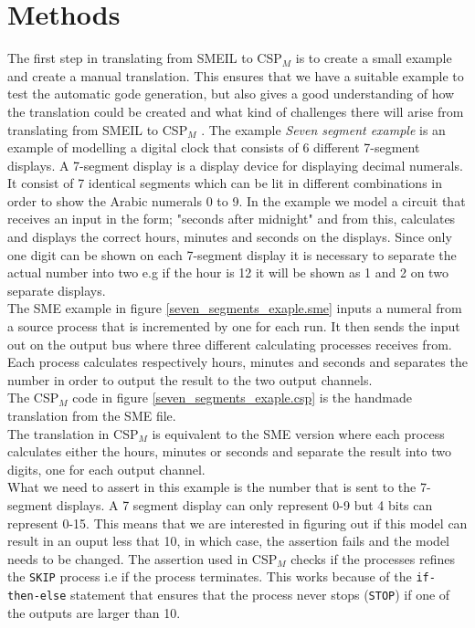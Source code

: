 \documentclass[a4paper]{report}
\newcommand{\cspm}{CSP$_M$ }
\begin{document}
\chapter{Methods}
The first step in translating from SMEIL to \cspm is to create a small example and create a manual translation. This ensures that we have a suitable example to test the automatic gode generation, but also gives a good understanding of how the translation could be created and what kind of challenges there will arise from translating from SMEIL to \cspm. 
The example \textit{Seven segment example} is an example of modelling a digital clock that consists of 6 different 7-segment displays. A 7-segment display is a display device for displaying decimal numerals. It consist of 7 identical segments which can be lit in different combinations in order to show the Arabic numerals 0 to 9. In the example we model a circuit that receives an input in the form; "seconds after midnight" and from this, calculates and displays the correct hours, minutes and seconds on the displays. Since only one digit can be shown on each 7-segment display it is necessary to separate the actual number into two e.g if the hour is 12 it will be shown as 1 and 2 on two separate displays. \\ The SME example in figure \ref{seven_segments_exaple.sme} inputs a numeral from a source process that is incremented by one for each run. It then sends the input out on the output bus where three different calculating processes receives from. Each process calculates respectively hours, minutes and seconds and separates the number in order to output the result to the two output channels. \\ The \cspm code in figure \ref{seven_segments_exaple.csp} is the handmade translation from the SME file. \\ The translation in \cspm is equivalent to the SME version where each process calculates either the hours, minutes or seconds and separate the result into two digits, one for each output channel.\\ 
What we need to assert in this example is the number that is sent to the 7-segment displays. A 7 segment display can only represent 0-9 but 4 bits can represent 0-15. This means that we are interested in figuring out if this model can result in an ouput less that 10, in which case, the assertion fails and the model needs to be changed. The assertion used in \cspm checks if the processes refines the \texttt{SKIP} process i.e if the process terminates. This works because of the \texttt{if-then-else} statement that ensures that the process never stops (\texttt{STOP}) if one of the outputs are larger than 10. \\\\ 
\end{document}
